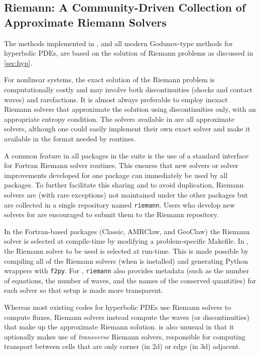 %
%

\subsection{Riemann: A Community-Driven Collection of Approximate Riemann
Solvers}\label{sec:riemann}

The methods implemented in \clawpack, and all modern Godunov-type methods for
hyperbolic PDEs, are based on the solution of Riemann problems as discussed
in \cref{sec:hyp}.

For nonlinear systems, the exact solution of the Riemann problem is
computationally costly and may involve both discontinuities (shocks and contact
waves) and rarefactions.  It is almost always preferable to employ inexact
Riemann solvers that approximate the solution using discontinuities only, with
an appropriate entropy condition.  The solvers available in \clawpack are
all approximate solvers, although one could easily implement their own exact
solver and make it available in the format needed by \clawpack routines.

A common feature in all packages in the \clawpack suite is the
use of a standard interface for Fortran Riemann solver routines.  This ensures that new
solvers or solver improvements developed for one package can immediately
be used by all packages.  To further facilitate this sharing and to avoid
duplication, Riemann solvers are (with rare exceptions) not maintained under
the other packages but are collected in a single repository named 
\texttt{riemann}.
Users who develop new solvers for \clawpack are encouraged to submit them to the
Riemann repository.

In the Fortran-based packages (Classic, AMRClaw, and GeoClaw) the Riemann solver
is selected at compile-time by modifying a problem-specific Makefile. In
\pyclaw, the Riemann solver to be used is selected at run-time.  This is made
possible by compiling all of the Riemann solvers (when \pyclaw is installed) and
generating Python wrappers with \texttt{f2py}.  For \pyclaw, \texttt{riemann}
also
provides metadata (such as the number of equations, the number of waves,
and the names of the conserved quantities) for each solver so that setup is
made more transparent.

Whereas most existing codes for hyperbolic PDEs use Riemann solvers to
compute fluxes, \clawpack Riemann solvers instead compute the waves
(or discontinuities) that make up the approximate Riemann solution.
\clawpack is also unusual in that it optionally makes use of {\em transverse}
Riemann solvers, responsible for computing transport between cells that
are only corner (in 2d) or edge (in 3d) adjacent.
